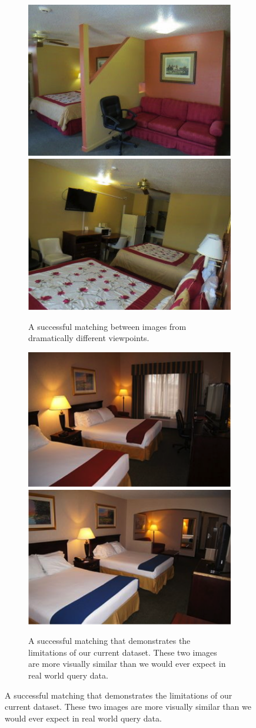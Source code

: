\begin{figure}[p]
  \begin{center}
  
  \begin{subfigure}[b]{.9\textwidth}
    \includegraphics[width=.5\columnwidth]{figures/chapter3/good2a.png}
    \includegraphics[width=.5\columnwidth]{figures/chapter3/good2b.png}
    \caption{A successful matching between images from dramatically different viewpoints.}
  \end{subfigure}
  
  \begin{subfigure}[b]{.9\textwidth}
    \includegraphics[width=.5\columnwidth]{figures/chapter3/good1a.png}
    \includegraphics[width=.5\columnwidth]{figures/chapter3/good1b.png}
    \caption{A successful matching that demonstrates the limitations of our current dataset. These two images are more visually similar than we would ever expect in real world query data.}
  \end{subfigure}
  

\end{center}
\end{figure}
